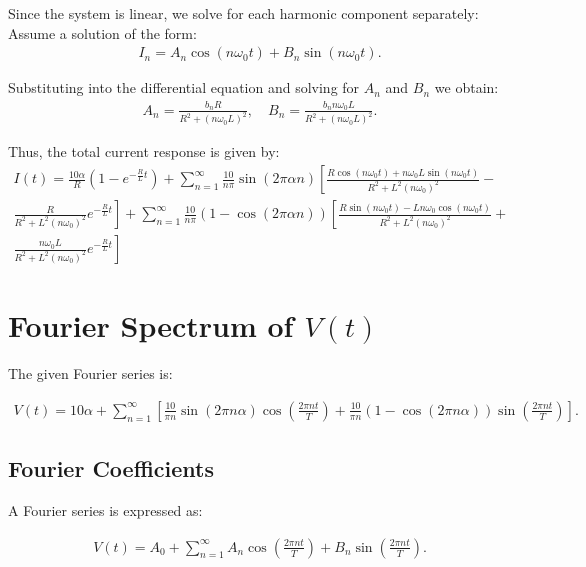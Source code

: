 \documentclass[12pt,a4paper]{report}
\begin{document}
Since the system is linear, we solve for each harmonic component separately:\\
Assume a solution of the form:\\
\begin{align}
I_n = A_n\cos(n\omega_0 t) + B_n\sin(n\omega_0 t). \tag{0.18}
\end{align}

Substituting into the differential equation and solving for $A_{n}$ and $B_{n}$ we obtain:\
\begin{align}
A_n = \frac{b_nR}{R^2 + (n\omega_0L)^2}, \quad B_n = \frac{b_n n\omega_0 L}{R^2 + (n\omega_0L)^2}. \tag{0.19}
\end{align}

Thus, the total current response is given by:\\
\begin{align*}
I(t) = \frac{10\alpha}{R}\left(1-e^{-\frac{R}{L}t}\right) + \sum_{n=1}^{\infty}\frac{10}{n\pi}\sin(2\pi \alpha n)\left[\frac{R\cos(n\omega_0t) + n\omega_0L\sin(n\omega_0t)}{R^2 + L^2(n\omega_0)^2} - \right. \\
\left. \frac{R}{R^2 + L^2(n\omega_0)^2}e^{-\frac{R}{L}t}\right] 
+ \sum_{n=1}^{\infty}\frac{10}{n\pi}(1-\cos(2\pi \alpha n))\left[\frac{R\sin(n\omega_0t) - Ln\omega_0\cos(n\omega_0t)}{R^2 + L^2(n\omega_0)^2} + \right. \\
\left. \frac{n\omega_0L}{R^2 + L^2(n\omega_0)^2}e^{-\frac{R}{L}t}\right] \tag{0.21}
\end{align*}
\section{Fourier Spectrum of $ V(t) $}

The given Fourier series is:

\begin{align}
V(t) = 10\alpha + \sum_{n=1}^{\infty} \left[ \frac{10}{\pi n} \sin(2\pi n \alpha) \cos\left( \frac{2\pi n t}{T} \right) + \frac{10}{\pi n} (1 - \cos(2\pi n \alpha)) \sin\left( \frac{2\pi n t}{T} \right) \right].
\end{align}

\subsection{Fourier Coefficients}

A Fourier series is expressed as:

\begin{align}
V(t) = A_0 + \sum_{n=1}^{\infty} A_n \cos\left( \frac{2\pi n t}{T} \right) + B_n \sin\left( \frac{2\pi n t}{T} \right).
\end{align}
\end{document}
